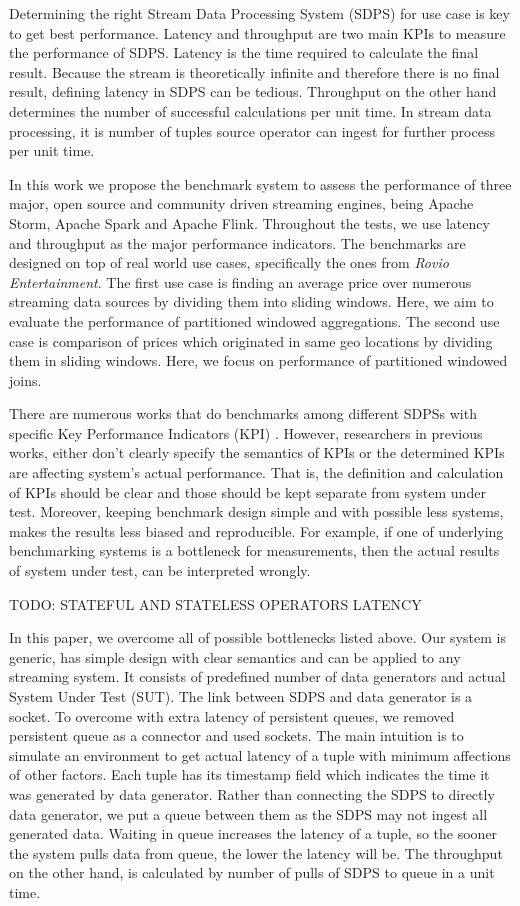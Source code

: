 \documentclass{vldb}
\begin{document}
Determining the right  Stream Data Processing System (SDPS) for use case is key to get best performance. Latency and throughput are two main KPIs to measure the performance of SDPS. Latency is the time required to calculate the final result. Because the stream is theoretically infinite and therefore there is no final result, defining latency in SDPS can be tedious. Throughput on the other hand determines the number of successful calculations per unit time. In stream data processing, it is number of tuples source operator can ingest for further process per unit time. 

In this work we propose the benchmark system to assess the performance of three major, open source and community driven streaming engines, being Apache Storm, Apache Spark and Apache Flink.  Throughout  the tests, we use latency and throughput as the major performance indicators. The benchmarks are designed on top of real world use cases, specifically the ones from \textit{Rovio Entertainment}. The  first use case is finding an average price  over numerous streaming data sources by dividing them  into sliding windows. Here, we aim to evaluate the performance of partitioned windowed aggregations. The second use case is comparison of prices which originated in same geo locations by dividing them in sliding windows. Here, we focus on performance of partitioned windowed joins. 

There are numerous works that do benchmarks among different SDPSs with specific Key Performance Indicators (KPI) \cite{perera2016reproducible,chintapalli2016benchmarking}. 
However, researchers in previous works, either don't clearly specify the semantics of KPIs or the determined KPIs are affecting system's actual performance. That is, the definition and calculation of KPIs should be clear and those should be kept separate from system under test.  Moreover, keeping benchmark design simple and with possible less systems, makes the results less biased and reproducible. For example, if one of underlying benchmarking systems is a bottleneck for measurements, then the actual results of system  under test, can be interpreted wrongly. 

TODO: STATEFUL AND STATELESS OPERATORS LATENCY

In this paper, we overcome all of  possible bottlenecks listed above. Our system is generic, has simple design with clear semantics and can be applied to any streaming system. It consists of predefined number of data generators and actual System Under Test (SUT). The link between SDPS and data generator is a socket. To overcome with extra latency of persistent queues, we removed persistent queue as a connector and used sockets. The main intuition is to simulate an environment to get actual latency of a tuple with minimum  affections of other factors. Each tuple has its timestamp field which indicates the time it was generated by data generator. Rather than connecting the SDPS to directly data generator, we put a queue between them as the SDPS may not ingest all generated data. Waiting in queue increases the latency of a tuple, so the sooner the system pulls data from queue, the lower the latency will be. The throughput on the other hand, is calculated by number of pulls of SDPS to queue in a unit time. 
\end{document}

